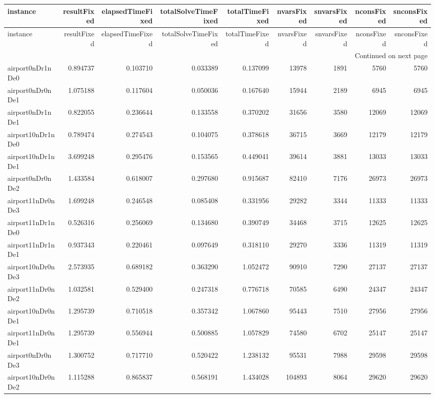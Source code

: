 
\begin{longtable}{|l|r|r|r|r|r|r|r|r|}
\toprule
instance & resultFixed & elapsedTimeFixed & totalSolveTimeFixed & totalTimeFixed & nvarsFixed & snvarsFixed & nconsFixed & snconsFixed \\
\midrule
\endfirsthead
\toprule
instance & resultFixed & elapsedTimeFixed & totalSolveTimeFixed & totalTimeFixed & nvarsFixed & snvarsFixed & nconsFixed & snconsFixed \\
\midrule
\endhead
\midrule
\multicolumn{9}{r}{Continued on next page} \\
\midrule
\endfoot
\bottomrule
\endlastfoot
airport0nDr1nDe0 & 0.894737 & 0.103710 & 0.033389 & 0.137099 & 13978 & 1891 & 5760 & 5760 \\
airport0nDr0nDe1 & 1.075188 & 0.117604 & 0.050036 & 0.167640 & 15944 & 2189 & 6945 & 6945 \\
airport0nDr1nDe1 & 0.822055 & 0.236644 & 0.133558 & 0.370202 & 31656 & 3580 & 12069 & 12069 \\
airport10nDr1nDe0 & 0.789474 & 0.274543 & 0.104075 & 0.378618 & 36715 & 3669 & 12179 & 12179 \\
airport10nDr1nDe1 & 3.699248 & 0.295476 & 0.153565 & 0.449041 & 39614 & 3881 & 13033 & 13033 \\
airport0nDr0nDe2 & 1.433584 & 0.618007 & 0.297680 & 0.915687 & 82410 & 7176 & 26973 & 26973 \\
airport11nDr0nDe3 & 1.699248 & 0.246548 & 0.085408 & 0.331956 & 29282 & 3344 & 11333 & 11333 \\
airport11nDr1nDe0 & 0.526316 & 0.256069 & 0.134680 & 0.390749 & 34468 & 3715 & 12625 & 12625 \\
airport11nDr1nDe1 & 0.937343 & 0.220461 & 0.097649 & 0.318110 & 29270 & 3336 & 11319 & 11319 \\
airport10nDr0nDe3 & 2.573935 & 0.689182 & 0.363290 & 1.052472 & 90910 & 7290 & 27137 & 27137 \\
airport11nDr0nDe2 & 1.032581 & 0.529400 & 0.247318 & 0.776718 & 70585 & 6490 & 24347 & 24347 \\
airport10nDr0nDe1 & 1.295739 & 0.710518 & 0.357342 & 1.067860 & 95443 & 7510 & 27956 & 27956 \\
airport11nDr0nDe1 & 1.295739 & 0.556944 & 0.500885 & 1.057829 & 74580 & 6702 & 25147 & 25147 \\
airport0nDr0nDe3 & 1.300752 & 0.717710 & 0.520422 & 1.238132 & 95531 & 7988 & 29598 & 29598 \\
airport10nDr0nDe2 & 1.115288 & 0.865837 & 0.568191 & 1.434028 & 104893 & 8064 & 29620 & 29620 \\

\end{longtable}
